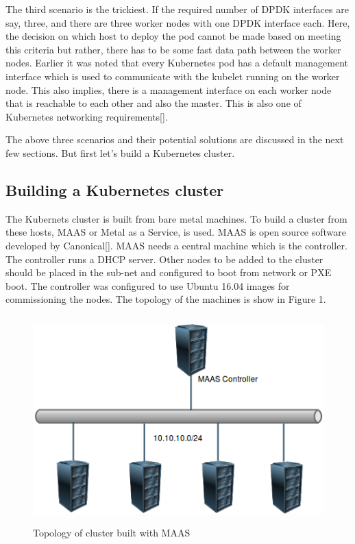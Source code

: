 \documentclass[english, 12pt, a4paper, elec, utf8, a-1b, online]{aaltothesis}
\begin{document}
The third scenario is the trickiest. If the required number of DPDK interfaces are say, three, and there are three worker nodes with one DPDK interface each. Here, the decision on which host to deploy the pod cannot be made based on meeting this criteria but rather, there has to be some fast data path between the worker nodes. Earlier it was noted that every Kubernetes pod has a default management interface which is used to communicate with the kubelet running on the worker node. This also implies, there is a management interface on each worker node that is reachable to each other and also the master. This is also one of Kubernetes networking requirements[].

The above three scenarios and their potential solutions are discussed in the next few sections. But first let's build a Kubernetes cluster.

\subsection{Building a Kubernetes cluster}
The Kubernets cluster is built from bare metal machines. To build a cluster from these hosts, MAAS or Metal as a Service, is used. MAAS is open source software developed by Canonical[]. MAAS needs a central machine which is the controller. The controller runs a DHCP server. Other nodes to be added to the cluster should be placed in the sub-net and configured to boot from network or PXE boot. The controller was configured to use Ubuntu 16.04 images for commissioning the nodes. The topology of the machines is show in Figure 1. 

\begin{figure}[htb]
\begin{center}
\includegraphics[height=8cm]{pics/MAAS-topology.png}
\end{center}
\caption{Topology of cluster built with MAAS}
\label{liitekuva}
\end{figure}
\end{document}
